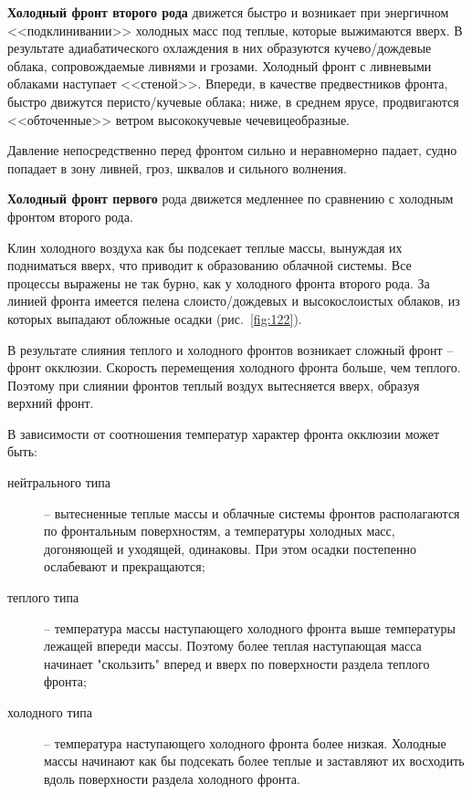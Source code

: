 \documentclass[a4paper, 12pt, twoside, final, book, russian, fittopage, cyremdash]{ncc}
\newcommand{\ris}[1]{\ref{fig:#1}}
\begin{document}
\textbf{Холодный фронт второго рода} движется быстро и возникает при энергичном <<подклинивании>> холодных масс под теплые, которые выжимаются вверх. В результате адиабатического охлаждения в них образуются кучево\-/дождевые облака, сопровождаемые ливнями и грозами. Холодный фронт с ливневыми облаками наступает <<стеной>>. Впереди, в качестве предвестников фронта, быстро движутся перисто\-/кучевые облака; ниже, в среднем ярусе, продвигаются <<обточенные>> ветром высококучевые чечевицеобразные.

Давление непосредственно перед фронтом сильно и неравномерно падает, судно попадает в зону ливней, гроз, шквалов и сильного волнения.

\textbf{Холодный фронт первого} рода движется медленнее по сравнению с холодным фронтом второго рода.

Клин холодного воздуха как бы подсекает теплые массы, вынуждая их подниматься вверх, что приводит к образованию облачной системы. Все процессы выражены не так бурно, как у холодного фронта второго рода. За линией фронта имеется пелена слоисто\-/дождевых и высокослоистых облаков, из которых выпадают обложные осадки (рис.~\ris{122}).

В результате слияния теплого и холодного фронтов возникает сложный фронт \--- фронт окклюзии. Скорость перемещения холодного фронта больше, чем теплого. Поэтому при слиянии фронтов теплый воздух вытесняется вверх, образуя верхний фронт.

В зависимости от соотношения температур характер фронта окклюзии может быть:
\begin{description}
\item[нейтрального типа] \--- вытесненные теплые массы и облачные системы фронтов располагаются по фронтальным поверхностям, а температуры холодных масс, догоняющей и уходящей, одинаковы. При этом осадки постепенно ослабевают и прекращаются; 
\item[теплого типа] \--- температура массы наступающего холодного фронта выше температуры лежащей впереди массы. Поэтому более теплая наступающая масса начинает "скользить" вперед и вверх по поверхности раздела теплого фронта; 
\item[холодного типа] \--- температура наступающего холодного фронта более низкая. Холодные массы начинают как бы подсекать более теплые и заставляют их восходить вдоль поверхности раздела холодного фронта. 
\end{description}
\end{document}
